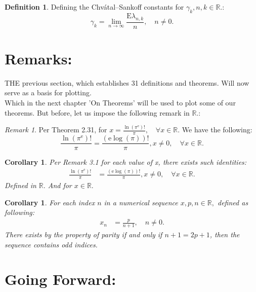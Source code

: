 \documentclass[10pt]{article}
\theoremstyle{plain}
\newtheorem{corollary}[theorem]{Corollary}
\theoremstyle{definition}
\newtheorem{definition}[theorem]{Definition}
\theoremstyle{remark}
\newtheorem{remark}[theorem]{Remark}
\begin{document}
\begin{definition}
	Defining the Chvátal–Sankoff constants for $\gamma_k, n, k \in \mathbb{R}.$:
	\begin{equation}
		\gamma_k = \lim_{n \to \infty} \frac{\mathrm{E}{\lambda_{n, k}}}{n}, \quad n \neq 0.
	\end{equation}
\end{definition}

\section{Remarks:}
\lettrine[lines=2, lhang=0.1, loversize=0.2]{T}HE previous section, which establishes 31 definitions and theorems. Will now serve as a basis for plotting.\\
Which in the next chapter 'On Theorems' will be used to plot some of our theorems. But before, let us impose the following remark in $\mathbb{R}.$:

\begin{remark}
	Per Theorem 2.31, for $x = \frac{\ln(\pi^\mathrm{e})!}{\pi}, \quad \forall x \in \mathbb{R}.$ We have the following:
	\begin{equation}
		\frac{\ln(\pi^\mathrm{e})!}{\pi} = \frac{(\mathrm{e} \log(\pi))!}{\pi}, x \neq 0, \quad \forall x \in \mathbb{R}.
	\end{equation}
\end{remark}

\begin{corollary}
	Per Remark 3.1 for each value of x, there exists such identities:
	\begin{align*}
		\frac{\ln(\pi^\mathrm{e})!}{\pi} &= \frac{(\mathrm{e} \log(\pi))!}{\pi}, x \neq 0, \quad \forall x \in \mathbb{R}.
	\end{align*}
	Defined in $\mathbb{R}.$ And for $x \in \mathbb{R}.$
\end{corollary}

\begin{corollary}
	For each index $n$ in a numerical sequence $x, p, n \in \mathbb{R},$ defined as following:
	\begin{align*}
		x_n &= \frac{p}{n+1}, \quad n \neq 0.
	\end{align*}
	There exists by the property of parity if and only if $n+1 = 2p + 1$, then the sequence contains  odd indices.
\end{corollary}

\section{Going Forward:}
\end{document}
